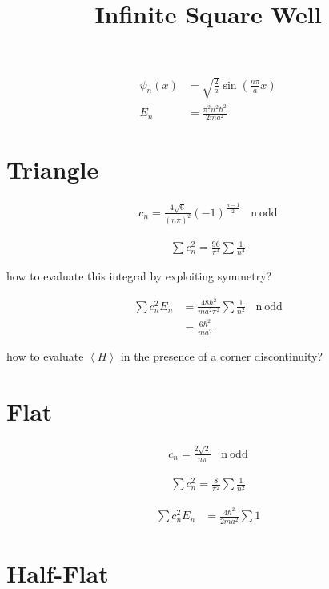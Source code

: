 \documentclass{article}
\title{Infinite Square Well}
\date{}
\newcommand{\<}{\langle}
\renewcommand{\>}{\rangle}
\renewcommand{\l}{\left}
\renewcommand{\r}{\right}
\begin{document}
\maketitle

\begin{align*}
\psi_n(x) &= \sqrt{\frac{2}{a}} \sin\l(\frac{n\pi}{a} x\r) \\
E_n &= \frac{\pi^2 n^2 \hbar^2}{2ma^2}
\end{align*}

\section{Triangle}

\begin{align*}
c_n = \frac{4\sqrt{6}}{(n\pi)^2}(-1)^{\frac{n-1}{2}}\ \ \ \  \mathrm{n\ odd}
\end{align*}

\begin{align*}
\sum c_n^2 = \frac{96}{\pi^4} \sum\frac{1}{n^4}
\end{align*}

how to evaluate this integral by exploiting symmetry?

\begin{align*}
\sum c_n^2 E_n &= \frac{48\hbar^2}{ma^2\pi^2} \sum\frac{1}{n^2}\ \ \ \ \mathrm{n\ odd} \\
&= \frac{6\hbar^2}{ma^2}
\end{align*}

how to evaluate $\l< H \r>$ in the presence of a corner discontinuity?

\section{Flat}

\begin{align*}
c_n = \frac{2\sqrt{2}}{n\pi}\ \ \ \  \mathrm{n\ odd}
\end{align*}

\begin{align*}
\sum c_n^2 = \frac{8}{\pi^2} \sum\frac{1}{n^2}
\end{align*}

\begin{align*}
\sum c_n^2 E_n &= \frac{4\hbar^2}{2ma^2} \sum 1
\end{align*}

\section{Half-Flat}
\end{document}

